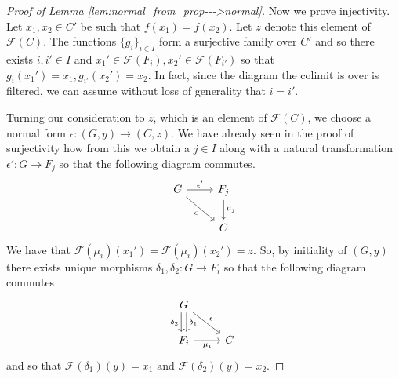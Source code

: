 \documentclass[12pt]{article}
\theoremstyle{plain}
\theoremstyle{definition}
\newcommand{\scr}[1]{\mathscr{#1}}
\newcommand{\lto}{\longrightarrow}
\begin{document}
\begin{proof}[Proof of Lemma \ref{lem:normal_from_prop--->normal}]
		Now we prove injectivity. Let $x_1,x_2 \in C'$ be such that $f(x_1) = f(x_2)$. Let $z$ denote this element of $\scr{F}(C)$. The functions $\{ g_i\}_{i \in I}$ form a surjective family over $C'$ and so there exists $i,i' \in I$ and $x_1' \in \scr{F}(F_i), x_2' \in \scr{F}(F_{i'})$ so that $g_i(x_1') = x_1, g_{i'}(x_2') = x_2$. In fact, since the diagram the colimit is over is filtered, we can assume without loss of generality that $i = i'$.
		
		Turning our consideration to $z$, which is an element of $\scr{F}(C)$, we choose a normal form $\epsilon: (G, y) \lto (C, z)$. We have already seen in the proof of surjectivity how from this we obtain a $j \in I$ along with a natural transformation $\epsilon': G \lto F_j$ so that the following diagram commutes.
		\begin{equation}\label{eq:by_finiteness}
			\begin{tikzcd}
				G\arrow[r,"{\epsilon'}"]\arrow[dr,swap,"{\epsilon}"] & F_j\arrow[d,"{\mu_j}"]\\
				& C
				\end{tikzcd}
			\end{equation}
		We have that $\scr{F}(\mu_i)(x_1') = \scr{F}(\mu_i)(x_2') = z$. So, by initiality of $(G,y)$ there exists unique morphisms $\delta_1,\delta_2: G \lto F_i$ so that the following diagram commutes
		\begin{equation}\label{eq:by_normality}
		\begin{tikzcd}
			G\arrow[dr,"{\epsilon}"]\arrow[d,swap, shift right, "{\delta_2}"]\arrow[d,shift left, "{\delta_1}"]\\
			F_i\arrow[r,swap,"{\mu_i}"] & C
			\end{tikzcd}
		\end{equation}
		and so that $
			\scr{F}(\delta_1)(y) = x_1\text{ and }\scr{F}(\delta_2)(y) = x_2$.
		

\end{proof}
\end{document}
